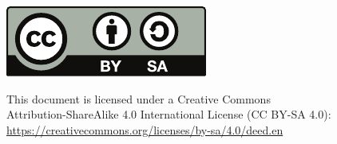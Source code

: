 \includegraphics[scale=0.7]{logos/cc-by-sa.pdf}

\vspace{0.5em}

This document is licensed under a Creative Commons \\
Attribution-ShareAlike 4.0 International License (CC BY-SA 4.0): \\
\url{https://creativecommons.org/licenses/by-sa/4.0/deed.en}
